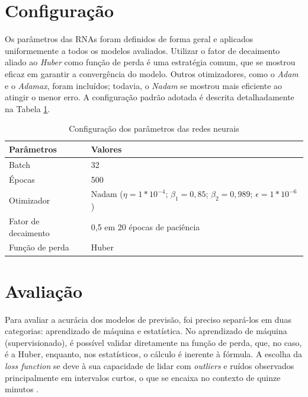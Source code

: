 \section{Configuração} \label{sec:configuracao} 
Os parâmetros das RNAs foram definidos de forma geral e aplicados uniformemente a todos os modelos avaliados.
Utilizar o fator de decaimento aliado ao \textit{Huber} como função de perda é uma estratégia comum, que se mostrou eficaz em garantir a convergência do modelo.
Outros otimizadores, como o \textit{Adam} e o \textit{Adamax}, foram incluídos; todavia, o \textit{Nadam} se mostrou mais eficiente ao atingir o menor erro.
A configuração padrão adotada é descrita detalhadamente na Tabela \ref{tabela:parametros}.

\begin{table}[h!]
    \caption{Configuração dos parâmetros das redes neurais} \label{tabela:parametros}
    \begin{tabularx}{\textwidth}{X|X} \hline
    Parâmetros & Valores \\ \hline
    Batch         & 32               \\ \hline
    Épocas         & 500              \\ \hline
    Otimizador               & Nadam ($\eta=1*10^{-4}$; $\beta_1=0{,}85$; $\beta_2=0{,}989$; $\epsilon= 1*10^{-6}$)             \\ \hline
    Fator de decaimento          & 0,5 em 20 épocas de paciência           \\ \hline
    Função de perda          & Huber              \\ \hline
    \end{tabularx}
\end{table}

\section{Avaliação} \label{sec:avaliacao}
Para avaliar a acurácia dos modelos de previsão, foi preciso separá-los em duas categorias: aprendizado de máquina e estatística.
No aprendizado de máquina (supervisionado), é possível validar diretamente na função de perda, que, no caso, é a Huber, enquanto, nos estatísticos, o cálculo é inerente à fórmula.
A escolha da \textit{loss function} se deve à sua capacidade de lidar com \textit{outliers} e ruídos observados principalmente em intervalos curtos, o que se encaixa no contexto de quinze minutos \cite{Jaiswal}.

